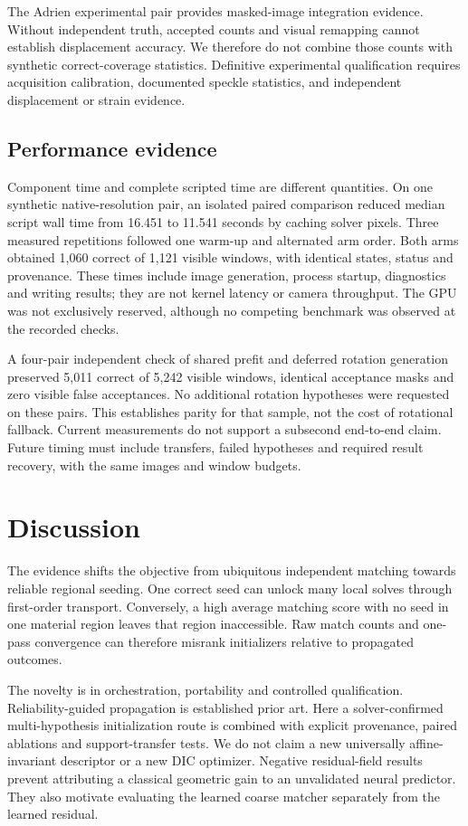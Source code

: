 \documentclass[11pt,a4paper]{article}
\begin{document}
The Adrien experimental pair provides masked-image integration evidence. Without independent truth, accepted counts and visual remapping cannot establish displacement accuracy. We therefore do not combine those counts with synthetic correct-coverage statistics. Definitive experimental qualification requires acquisition calibration, documented speckle statistics, and independent displacement or strain evidence.

\subsection{Performance evidence}
Component time and complete scripted time are different quantities. On one synthetic native-resolution pair, an isolated paired comparison reduced median script wall time from 16.451 to 11.541 seconds by caching solver pixels. Three measured repetitions followed one warm-up and alternated arm order. Both arms obtained 1,060 correct of 1,121 visible windows, with identical states, status and provenance. These times include image generation, process startup, diagnostics and writing results; they are not kernel latency or camera throughput. The GPU was not exclusively reserved, although no competing benchmark was observed at the recorded checks.

A four-pair independent check of shared prefit and deferred rotation generation preserved 5,011 correct of 5,242 visible windows, identical acceptance masks and zero visible false acceptances. No additional rotation hypotheses were requested on these pairs. This establishes parity for that sample, not the cost of rotational fallback. Current measurements do not support a subsecond end-to-end claim. Future timing must include transfers, failed hypotheses and required result recovery, with the same images and window budgets.

\section{Discussion}
The evidence shifts the objective from ubiquitous independent matching towards reliable regional seeding. One correct seed can unlock many local solves through first-order transport. Conversely, a high average matching score with no seed in one material region leaves that region inaccessible. Raw match counts and one-pass convergence can therefore misrank initializers relative to propagated outcomes.

The novelty is in orchestration, portability and controlled qualification. Reliability-guided propagation is established prior art. Here a solver-confirmed multi-hypothesis initialization route is combined with explicit provenance, paired ablations and support-transfer tests. We do not claim a new universally affine-invariant descriptor or a new DIC optimizer. Negative residual-field results prevent attributing a classical geometric gain to an unvalidated neural predictor. They also motivate evaluating the learned coarse matcher separately from the learned residual.
\end{document}

